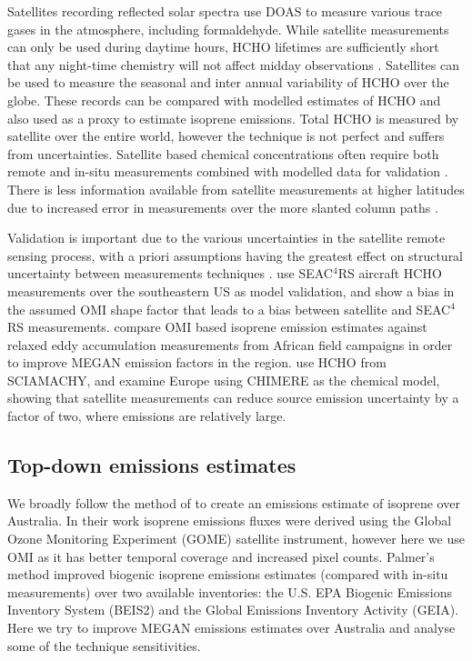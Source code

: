     Satellites recording reflected solar spectra use DOAS to measure various trace gases in the atmosphere, including formaldehyde. 
    While satellite measurements can only be used during daytime hours, HCHO lifetimes are sufficiently short that any night-time chemistry will not affect midday observations \parencite{Wolfe2016}.
    Satellites can be used to measure the seasonal and inter annual variability of HCHO over the globe.
    These records can be compared with modelled estimates of HCHO and also used as a proxy to estimate isoprene emissions.
    Total HCHO is measured by satellite over the entire world, however the technique is not perfect and suffers from uncertainties.
    Satellite based chemical concentrations often require both remote and in-situ measurements combined with modelled data for validation \parencite{Marais2014}.
    There is less information available from satellite measurements at higher latitudes due to increased error in measurements over the more slanted column paths \parencite{DeSmedt2015}.
    
    
    Validation is important due to the various uncertainties in the satellite remote sensing process, with a priori assumptions having the greatest effect on structural uncertainty between measurements techniques \textcite{Lorente2017}.
    \textcite{Zhu2016} use SEAC$^4$RS aircraft HCHO measurements over the southeastern US as model validation, and show a bias in the assumed OMI shape factor that leads to a bias between satellite and SEAC$^4$RS measurements.
    \textcite{Marais2014} compare OMI based isoprene emission estimates against relaxed eddy accumulation measurements from African field campaigns in order to improve MEGAN emission factors in the region.
    \textcite{Dufour2009} use HCHO from SCIAMACHY, and examine Europe using CHIMERE as the chemical model, showing that satellite measurements can reduce source emission uncertainty by a factor of two, where emissions are relatively large.
    
  
  \subsection{Top-down emissions estimates}
    
    We broadly follow the method of \textcite{Palmer2001} to create an emissions estimate of isoprene over Australia.
    In their work isoprene emissions fluxes were derived using the Global Ozone Monitoring Experiment (GOME) satellite instrument, however here we use OMI as it has better temporal coverage and increased pixel counts.
    Palmer's method improved biogenic isoprene emissions estimates (compared with in-situ measurements) over two available inventories: the U.S. EPA Biogenic Emissions Inventory System (BEIS2) and the Global Emissions Inventory Activity (GEIA).
    Here we try to improve MEGAN emissions estimates over Australia and analyse some of the technique sensitivities.

